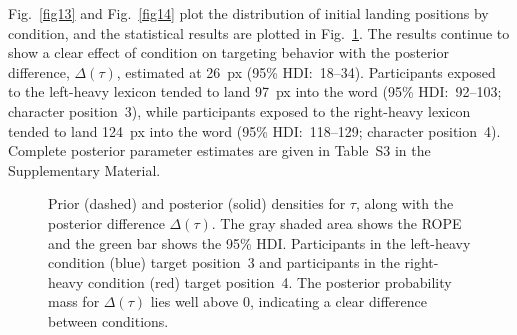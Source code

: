\documentclass[doc,biblatex]{apa7}
\begin{document}
Fig.~\ref{fig13} and Fig.~\ref{fig14} plot the distribution of initial landing positions by condition, and the statistical results are plotted in Fig.~\ref{fig15}. The results continue to show a clear effect of condition on targeting behavior with the posterior difference, $\Delta(\tau)$, estimated at 26~px (95\% HDI:~18--34). Participants exposed to the left-heavy lexicon tended to land 97~px into the word (95\% HDI:~92--103; character position~3), while participants exposed to the right-heavy lexicon tended to land 124~px into the word (95\% HDI:~118--129; character position~4). Complete posterior parameter estimates are given in Table~S3 in the Supplementary Material.

\begin{figure}
\vspace*{2pt}
\caption{Prior (dashed) and posterior (solid) densities for $\tau$, along with the posterior difference $\Delta(\tau)$. The gray shaded area shows the ROPE and the green bar shows the 95\% HDI. Participants in the left-heavy condition (blue) target position~3 and participants in the right-heavy condition (red) target position~4. The posterior probability mass for $\Delta(\tau)$ lies well above 0, indicating a clear difference between conditions.}
\label{fig15}
\end{figure}
\end{document}
